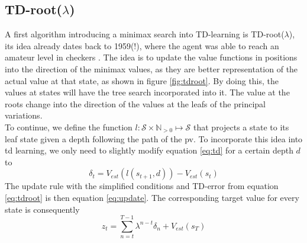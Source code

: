 \subsection{TD-root($\lambda$)}
\label{subsec:tdroot}
A first algorithm introducing a minimax search into TD-learning is TD-root($\lambda$), its idea already dates back to 1959(!), where the agent was able to reach an amateur level in checkers \cite{samuel59}. The idea is to update the value functions in positions into the direction of the minimax values, as they are better representation of the actual value at that state, as shown in figure \ref{fig:tdroot}. By doing this, the values at states will have the tree search incorporated into it. The value at the roots change into the direction of the values at the leafs of the principal variations.\\
To continue, we define the function $l:\mathcal{S} \times \mathbb{N}_{>0}\mapsto\mathcal{S}$ that projects a state to its leaf state given a depth following the path of the \acrlong{pv}. To incorporate this idea into \gls{td} learning, we only need to slightly modify equation \ref{eq:td} for a certain depth $d$ to 
\begin{equation}
\label{eq:tdroot}
\delta_t=V_{est}\left(l(s_{t+1},d)\right)-V_{est}(s_{t})
\end{equation}
The update rule with the simplified conditions and TD-error from equation \ref{eq:tdroot} is then equation \ref{eq:update}. The corresponding target value for every state is consequently
\begin{equation}
z_t=\sum_{n=t}^{T-1} \lambda^{n-t} \delta_n+V_{est}(s_T)
\end{equation}

